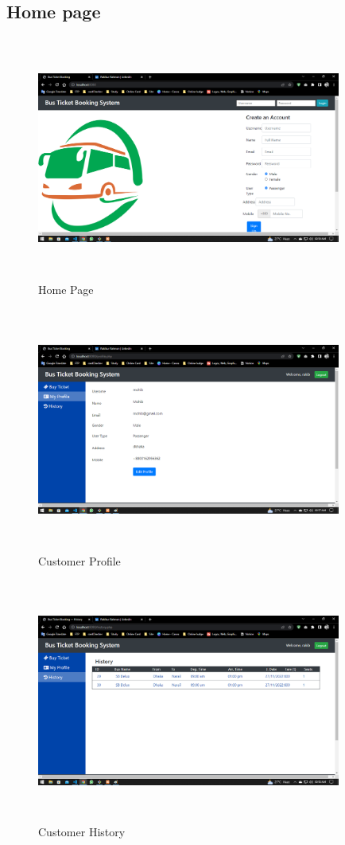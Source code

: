 \documentclass{article}
\begin{document}
\subsection{Home page}
\begin{figure}[h]
    \centering
    \includegraphics[width=10cm,height=8cm]{img/homepage.png}
    \caption{Home Page}
    \label{fig:my_label}
\end{figure}
\begin{figure}[h]
    \centering
    \includegraphics[width=10cm,height=8cm]{img/customer profile.png}
    \caption{Customer Profile}
    \label{fig:my_label}
\end{figure}
\begin{figure}[h]
    \centering
    \includegraphics[width=10cm,height=8cm]{img/customer history.png}
    \caption{Customer History}
    \label{fig:my_label}
\end{figure}
\end{document}
